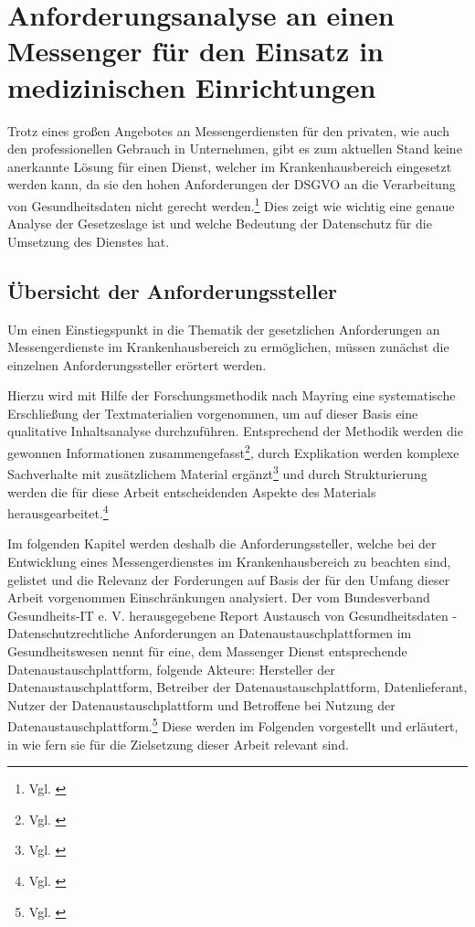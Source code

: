 \chapter{Anforderungsanalyse an einen Messenger für den Einsatz in medizinischen Einrichtungen}\label{chapter:ganforderungen}
Trotz eines großen Angebotes an Messengerdiensten für den privaten, wie auch den professionellen Gebrauch in Unternehmen, gibt es zum aktuellen Stand keine anerkannte Lösung für einen Dienst, welcher im Krankenhausbereich eingesetzt werden kann, da sie den hohen Anforderungen der DSGVO an die Verarbeitung von Gesundheitsdaten nicht gerecht werden.\footnote{Vgl. \cite[S. 1 ff.]{Datenschutzkonferenz2019}} Dies zeigt wie wichtig eine genaue Analyse der Gesetzeslage ist und welche Bedeutung der Datenschutz für die Umsetzung des Dienstes hat.

\section{Übersicht der Anforderungssteller}\label{chapter:hintergrund}
Um einen Einstiegspunkt in die Thematik der gesetzlichen Anforderungen an Messengerdienste im Krankenhausbereich zu ermöglichen, müssen zunächst die einzelnen Anforderungssteller erörtert werden.

Hierzu wird mit Hilfe der Forschungsmethodik nach Mayring eine systematische Erschließung der Textmaterialien vorgenommen, um auf dieser Basis eine qualitative Inhaltsanalyse durchzuführen. Entsprechend der Methodik werden die gewonnen Informationen zusammengefasst\footnote{Vgl. \cite[S. 548 ff.]{Baur2014}}, durch Explikation werden komplexe Sachverhalte mit zusätzlichem Material ergänzt\footnote{Vgl. \cite[S. 551 ff.]{Baur2014}} und durch Strukturierung werden die für diese Arbeit entscheidenden Aspekte des Materials herausgearbeitet.\footnote{Vgl. \cite[S. 547 ff.]{Baur2014}} 

Im folgenden Kapitel werden deshalb die Anforderungssteller, welche bei der Entwicklung eines Messengerdienstes im Krankenhausbereich zu beachten sind, gelistet und die Relevanz der Forderungen auf Basis der für den Umfang dieser Arbeit vorgenommen Einschränkungen analysiert. Der vom Bundesverband Gesundheits-IT e. V. herausgegebene Report \glqq Austausch von Gesundheitsdaten - Datenschutzrechtliche Anforderungen an Datenaustauschplattformen im Gesundheitswesen\grqq{} nennt für eine, dem Massenger Dienst entsprechende Datenaustauschplattform, folgende Akteure: Hersteller der Datenaustauschplattform, Betreiber der Datenaustauschplattform, Datenlieferant, Nutzer der Datenaustauschplattform und Betroffene bei Nutzung der Datenaustauschplattform.\footnote{Vgl. \cite[S. 13]{Bundesverband-Gesundheits-IT-e.V.2016}} Diese werden im Folgenden vorgestellt und erläutert, in wie fern sie für die Zielsetzung dieser Arbeit relevant sind.

